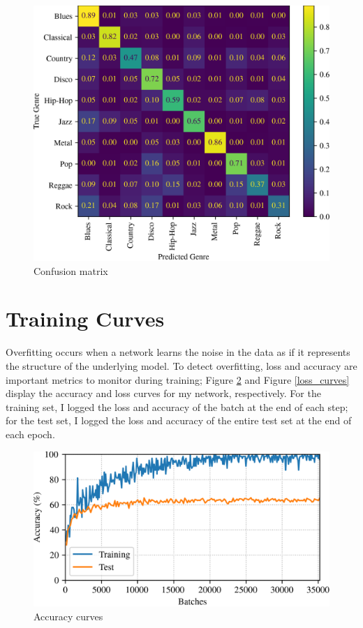 \documentclass[conference]{IEEEtran}
\begin{document}
\begin{figure}[htbp]
    \centerline{\includegraphics[width=\columnwidth]{cm.png}}
    \caption{Confusion matrix}
    \label{confusion_matrix}
\end{figure}

\section{Training Curves}

Overfitting occurs when a network learns the noise in the data as if it represents the structure of the underlying model.
To detect overfitting, loss and accuracy are important metrics to monitor during training; Figure \ref{accuracy_curves} and Figure \ref{loss_curves} display the accuracy and loss curves for my network, respectively.
For the training set, I logged the loss and accuracy of the batch at the end of each step; for the test set, I logged the loss and accuracy of the entire test set at the end of each epoch.

\begin{figure}[htbp]
    \centerline{\includegraphics[width=\columnwidth]{accuracy.png}}
    \caption{Accuracy curves}
    \label{accuracy_curves}
\end{figure}
\end{document}
